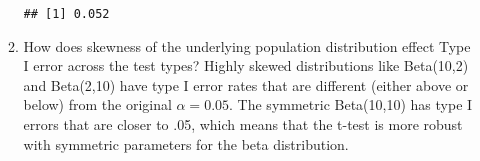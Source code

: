 \documentclass{article}\usepackage[]{graphicx}\usepackage[]{xcolor}
\makeatletter
\newenvironment{kframe}{%
 \def\at@end@of@kframe{}%
 \ifinner\ifhmode%
  \def\at@end@of@kframe{\end{minipage}}%
  \begin{minipage}{\columnwidth}%
 \fi\fi%
 \def\FrameCommand##1{\hskip\@totalleftmargin \hskip-\fboxsep
 \colorbox{shadecolor}{##1}\hskip-\fboxsep
     \hskip-\linewidth \hskip-\@totalleftmargin \hskip\columnwidth}%
 \MakeFramed {\advance\hsize-\width
   \@totalleftmargin\z@ \linewidth\hsize
   \@setminipage}}%
 {\par\unskip\endMakeFramed%
 \at@end@of@kframe}
\newenvironment{knitrout}{}{} %
\makeatother
\begin{document}
\begin{enumerate}
\begin{enumerate}
\begin{knitrout}
\begin{kframe}
\begin{verbatim}
## [1] 0.052
\end{verbatim}
\end{kframe}
\end{knitrout}
    \item How does skewness of the underlying population distribution effect
    Type I error across the test types?
    Highly skewed distributions like Beta(10,2) and Beta(2,10) have type I error rates that are different (either above or below) from the original $\alpha = 0.05$.
    The symmetric Beta(10,10) has type I errors that are closer to .05, which means that the t-test is more robust with symmetric parameters for the beta distribution.
  \end{enumerate}
\end{enumerate}

\end{document}
